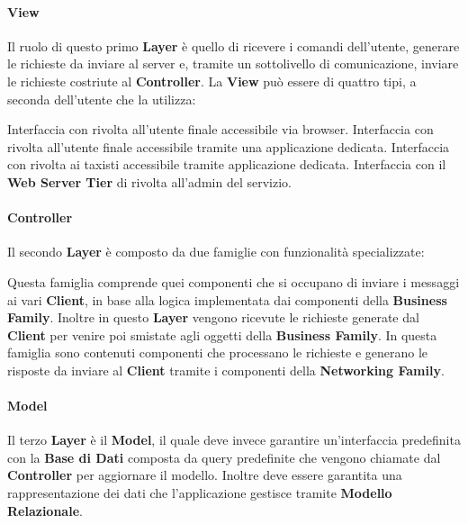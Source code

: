 \paragraph{View}
Il ruolo di questo primo \textbf{Layer} è quello di ricevere i comandi dell'utente, generare le richieste da inviare al server e, tramite un sottolivello di comunicazione, inviare le richieste costriute al \textbf{Controller}.
La \textbf{View} può essere di quattro tipi, a seconda dell'utente che la utilizza: 
\begin{itemize}
	 Interfaccia con \myTaxiService{} rivolta all'utente finale accessibile via browser.
	 Interfaccia con \myTaxiService{} rivolta all'utente finale accessibile tramite una applicazione dedicata.
	 Interfaccia con \myTaxiService{} rivolta ai taxisti accessibile tramite applicazione dedicata.
	 Interfaccia con il \textbf{Web Server Tier} di \myTaxiService{} rivolta all'admin del servizio.
\end{itemize}
\paragraph{Controller}
Il secondo \textbf{Layer} è composto da due famiglie con funzionalità specializzate:
\begin{itemize}
	Questa famiglia comprende quei componenti che si occupano di inviare i messaggi ai vari \textbf{Client}, in base alla logica implementata dai componenti della \textbf{Business Family}.
	Inoltre in questo \textbf{Layer} vengono ricevute le richieste generate dal \textbf{Client} per venire poi smistate agli oggetti della \textbf{Business Family}. 
	 In questa famiglia sono contenuti componenti che processano le richieste e generano le risposte da inviare al \textbf{Client} tramite i componenti della \textbf{Networking Family}. 
\end{itemize}
\paragraph{Model} 
Il terzo \textbf{Layer} è il \textbf{Model}, il quale deve invece garantire un'interfaccia predefinita con la \textbf{Base di Dati} composta da query predefinite che vengono chiamate dal \textbf{Controller} per aggiornare il modello. 
Inoltre deve essere garantita una rappresentazione dei dati che l'applicazione gestisce tramite \textbf{Modello Relazionale}.
